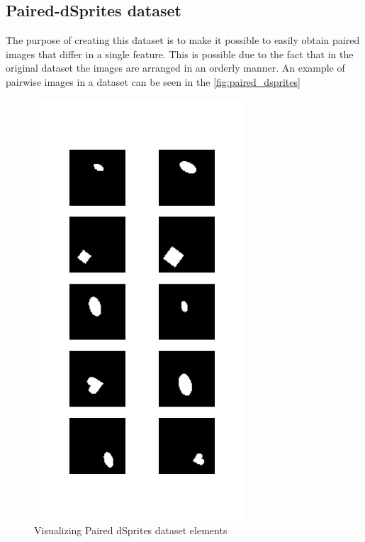 \documentclass{article}
\begin{document}
    \subsection{Paired-dSprites dataset}

    The purpose of creating this dataset is to make it possible to easily
    obtain paired images that differ in a single feature. This is possible
    due to the fact that in the original dataset the images are arranged in
    an orderly manner.
    An example of pairwise images in a dataset can be seen in the
    \autoref{fig:paired_dsprites}
    \begin{figure}[ht]
        \centering
        \includegraphics[width=0.7\textwidth]{img/datasets/paired_dsprites}
        \caption{Visualizing Paired dSprites dataset elements}
        \label{fig:paired_dsprites}
    \end{figure}
\end{document}
